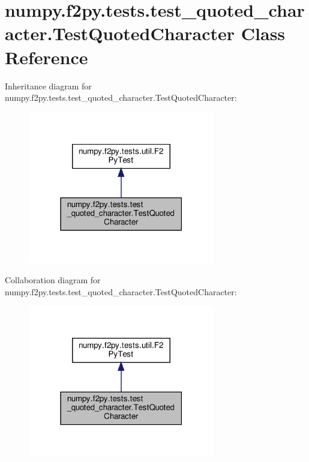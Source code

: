 \hypertarget{classnumpy_1_1f2py_1_1tests_1_1test__quoted__character_1_1TestQuotedCharacter}{}\section{numpy.\+f2py.\+tests.\+test\+\_\+quoted\+\_\+character.\+Test\+Quoted\+Character Class Reference}
\label{classnumpy_1_1f2py_1_1tests_1_1test__quoted__character_1_1TestQuotedCharacter}


Inheritance diagram for numpy.\+f2py.\+tests.\+test\+\_\+quoted\+\_\+character.\+Test\+Quoted\+Character\+:
\nopagebreak
\begin{figure}[H]
\begin{center}
\leavevmode
\includegraphics[width=231pt]{classnumpy_1_1f2py_1_1tests_1_1test__quoted__character_1_1TestQuotedCharacter__inherit__graph}
\end{center}
\end{figure}


Collaboration diagram for numpy.\+f2py.\+tests.\+test\+\_\+quoted\+\_\+character.\+Test\+Quoted\+Character\+:
\nopagebreak
\begin{figure}[H]
\begin{center}
\leavevmode
\includegraphics[width=231pt]{classnumpy_1_1f2py_1_1tests_1_1test__quoted__character_1_1TestQuotedCharacter__coll__graph}
\end{center}
\end{figure}
